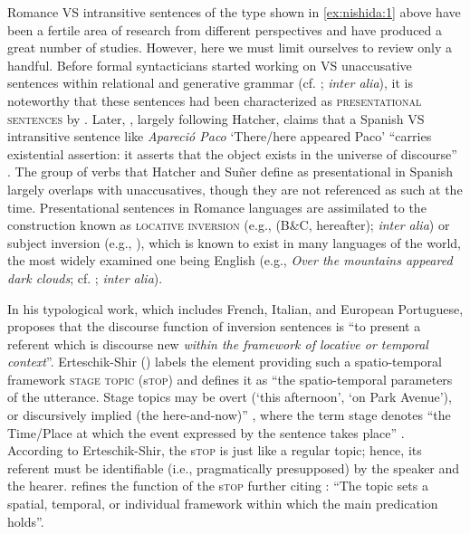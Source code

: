\documentclass[output=paper,colorlinks,citecolor=brown,
]{langscibook}
\begin{document}
Romance VS intransitive sentences of the type shown in \ref{ex:nishida:1} above have been a fertile area of research from different perspectives and have produced a great number of studies. However, here we must limit ourselves to review only a handful. Before formal syntacticians started working on VS unaccusative sentences within relational and generative grammar (cf. \citealt{perlmutter1978,burzio1986italian}; \textit{inter alia}), it is noteworthy that these sentences had been characterized as \textsc{presentational sentences} by \citet{hatcher1956}. Later, \citet{suner1982}, largely following Hatcher, claims that a Spanish VS intransitive sentence like \textit{Apareció Paco} `There/here appeared Paco'  
``carries existential assertion: it asserts that the object exists in the universe of discourse'' \citep[126]{suner1982}. The group of verbs that Hatcher and Suñer define as presentational in Spanish largely overlaps with unaccusatives, though they are not referenced as such at the time. Presentational sentences in Romance languages are assimilated to the construction known as \textsc{locative inversion} (e.g., \citealt{tortora1997,cornish2005cross,ortega2005locative,Sheehan2006,lahousse2007implicit,teixeira2016locative,bentley2018silent} (B\&C, hereafter); \textit{inter alia}) or subject inversion (e.g., \citealt{marandin2010subject}), which is known to exist in many languages of the world, the most widely examined one being English (e.g., \textit{Over the mountains appeared dark clouds}; cf. \citealt{birner1994information,levinrap1995}; \textit{inter alia}). 

In his typological work, which includes French, Italian, and European Portuguese, \citet[2, our emphasis]{cornish2005cross} proposes that the discourse function of inversion sentences is ``to present a referent which is discourse new \textit{within the framework of locative or temporal context}''. Erteschik-Shir (\citeyear{erteschik1997dynamics,erteschik1999focus}) labels the element providing such a spatio-temporal framework \textsc{stage topic} (s\textsc{top}) and defines it as 
``the spatio-temporal parameters of the utterance. Stage topics may be overt (`this afternoon', `on Park Avenue'), or discursively implied (the here-and-now)'' \citep[124]{erteschik1999focus}, where the term stage denotes ``the Time/Place at which the event expressed by the sentence takes place'' \citep[26--27]{erteschik1997dynamics}. According to Erteschik-Shir, the s\textsc{top} is just like a regular topic; hence, its referent must be identifiable (i.e., pragmatically presupposed) by the speaker and the hearer. \citet[2]{lahousse2007implicit} refines the function of the s\textsc{top} further citing \citet[50]{chafe1976givenness}: 
``The topic sets a spatial, temporal, or individual framework within which the main predication holds''. 
\end{document}
